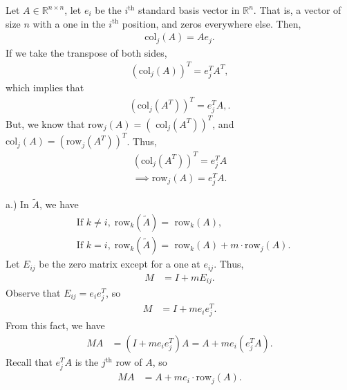 \documentclass{report}
\begin{document}
    \begin{remark}
     Let $A \in \mathbb{R}^{n\times n}$, let $e_{i}$ be the $i^{\text{th}}$ standard basis vector in $\mathbb{R}^{n}$. That is, a vector of size $n$ with a one in the $i^{\text{th}}$ position, and zeros everywhere else. Then,
    \begin{align*}
        \text{col}_{j}(A) = Ae_{j}
    .\end{align*}
    \bigbreak \noindent 
    If we take the transpose of both sides,
    \begin{align*}
        \left(\text{col}_{j}(A)\right)^{T} = e_{j}^{T}A^{T},
    \end{align*}
    which implies that
    \begin{align*}
        \left(\text{col}_{j}(A^{T})\right)^{T} = e_{j}^{T}A,
    .\end{align*}
    But, we know that $\text{row}_{j}(A) = (\text{ col}_{j}(A^{T}))^{T} $, and $\text{col}_{j}(A) = (\text{row}_{j}(A^{T}))^{T} $. Thus,
    \begin{align*}
        \left(\text{col}_{j}(A^{T})\right)^{T} = e_{j}^{T}A \\
        \implies \text{row}_{j}(A) = e_{j}^{T}A
    .\end{align*}
    \end{remark} 
    \bigbreak \noindent 
    a.) In $\tilde{A}$, we have
    \begin{align*}
        &\text{If } k \ne i,\; \text{row}_{k}(\tilde{A}) = \text{ row}_{k}(A), \\ 
        &\text{If } k = i,\; \text{row}_{k}(\tilde{A}) = \text{ row}_{k}(A) + m\cdot \text{row}_{j}(A)
    .\end{align*}
    \bigbreak \noindent 
    Let $E_{ij}$ be the zero matrix except for a one at $e_{ij}$. Thus, 
    \begin{align*}
        M &= I + mE_{ij}
    .\end{align*}
    Observe that $E_{ij} = e_{i}e_{j}^{T}$, so
    \begin{align*}
        M &= I + me_{i}e_{j}^{T}
    .\end{align*}
    From this fact, we have
    \begin{align*}
        MA &= (I + me_{i}e_{j}^{T})A = A + me_{i}(e_{j}^{T}A)
    .\end{align*}
    Recall that $e_{j}^{T}A$ is the $j^{\text{th}} $ row of $A$, so
    \begin{align*}
        MA &= A + me_{i} \cdot  \text{row}_{j}(A)
    .\end{align*}
\end{document}
